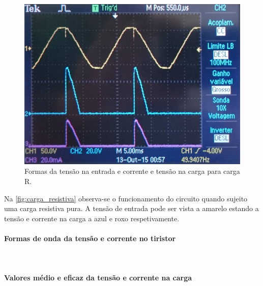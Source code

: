 \documentclass[a4paper,11pt]{article}
\numberwithin{equation}{section}
\begin{document}
\begin{figure}[H]
	\centering
	\includegraphics[keepaspectratio=true, scale=0.12]{img/figs/carga_resistiva}
	\caption{Formas da tensão na entrada e corrente e tensão na carga para carga R.}
	\label{fig:carga_resistiva}
	\vspace{-0.8em}
\end{figure}


Na \autoref{fig:carga_resistiva} observa-se o funcionamento do circuito quando sujeito uma carga resistiva pura. A tensão de entrada pode ser vista a amarelo estando a tensão e corrente na carga a azul e roxo respetivamente.




\paragraph{Formas de onda da tensão e corrente no tiristor}\mbox{}\


\paragraph{Valores médio e eficaz da tensão e corrente na carga}\mbox{}\
\end{document}
